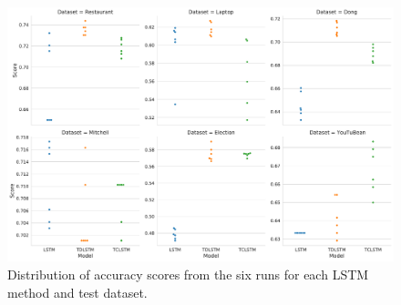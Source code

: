 \begin{figure}[!h]
    \centering
    \includegraphics[scale=0.37]{images/reproducibility/LSTM_Test_ACC.pdf}
    \caption{Distribution of accuracy scores from the six runs for each LSTM method and test dataset.}
    \label{figure:repro_LSTM_TEST_ACC}
\end{figure}